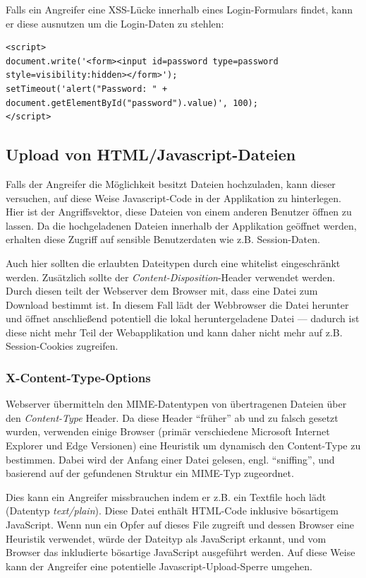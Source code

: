 Falls ein Angreifer eine XSS-Lücke innerhalb eines Login-Formulars findet, kann er diese ausnutzen um die Login-Daten zu stehlen:

\begin{verbatim}
<script>
document.write('<form><input id=password type=password style=visibility:hidden></form>');
setTimeout('alert("Password: " + document.getElementById("password").value)', 100);
</script>
\end{verbatim}

\subsection{Upload von HTML/Javascript-Dateien}
\label{upload_js}

Falls der Angreifer die Möglichkeit besitzt Dateien hochzuladen, kann dieser versuchen, auf diese Weise Javascript-Code in der Applikation zu hinterlegen. Hier ist der Angriffsvektor, diese Dateien von einem anderen Benutzer öffnen zu lassen. Da die hochgeladenen Dateien innerhalb der Applikation geöffnet werden, erhalten diese Zugriff auf sensible Benutzerdaten wie z.B. Session-Daten.

Auch hier sollten die erlaubten Dateitypen durch eine whitelist eingeschränkt werden. Zusätzlich sollte der \textit{Content-Disposition}-Header verwendet werden. Durch diesen teilt der Webserver dem Browser mit, dass eine Datei zum Download bestimmt ist. In diesem Fall lädt der Webbrowser die Datei herunter und öffnet anschließend potentiell die lokal heruntergeladene Datei --- dadurch ist diese nicht mehr Teil der Webapplikation und kann daher nicht mehr auf z.B. Session-Cookies zugreifen.

\subsubsection{X-Content-Type-Options}
\label{x_content_type_options}

Webserver übermitteln den MIME-Datentypen von übertragenen Dateien über den \textit{Content-Type} Header. Da diese Header ``früher'' ab und zu falsch gesetzt wurden, verwenden einige Browser (primär verschiedene Microsoft Internet Explorer und Edge Versionen) eine Heuristik um dynamisch den Content-Type zu bestimmen. Dabei wird der Anfang einer Datei gelesen, engl. ``sniffing'', und basierend auf der gefundenen Struktur ein MIME-Typ zugeordnet.

Dies kann ein Angreifer missbrauchen indem er z.B. ein Textfile hoch lädt (Datentyp \textit{text/plain}). Diese Datei enthält HTML-Code inklusive bösartigem JavaScript. Wenn nun ein Opfer auf dieses File zugreift und dessen Browser eine Heuristik verwendet, würde der Dateityp als JavaScript erkannt, und vom Browser das inkludierte bösartige JavaScript ausgeführt werden. Auf diese Weise kann der Angreifer eine potentielle Javascript-Upload-Sperre umgehen.

